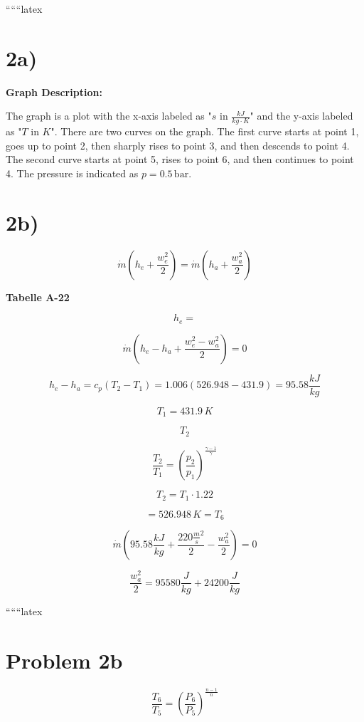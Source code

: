 
``````latex


\section*{2a)}

\begin{center}
\textbf{Graph Description:}
\end{center}

The graph is a plot with the x-axis labeled as "$s$ in \(\frac{kJ}{kg \cdot K}\)" and the y-axis labeled as "$T$ in $K$". There are two curves on the graph. The first curve starts at point 1, goes up to point 2, then sharply rises to point 3, and then descends to point 4. The second curve starts at point 5, rises to point 6, and then continues to point 4. The pressure is indicated as $p = 0.5 \, \text{bar}$.

\section*{2b)}

\[
\dot{m} \left( h_e + \frac{w_e^2}{2} \right) = \dot{m} \left( h_a + \frac{w_a^2}{2} \right)
\]

\textbf{Tabelle A-22}

\[
h_e = 
\]

\[
\dot{m} \left( h_e - h_a + \frac{w_e^2 - w_a^2}{2} \right) = 0
\]

\[
h_e - h_a = c_p (T_2 - T_1) = 1.006 \left( 526.948 - 431.9 \right) = 95.58 \frac{kJ}{kg}
\]

\[
T_1 = 431.9 \, K
\]

\[
T_2
\]

\[
\frac{T_2}{T_1} = \left( \frac{p_2}{p_1} \right)^{\frac{\gamma - 1}{\gamma}}
\]

\[
T_2 = T_1 \cdot 1.22
\]

\[
= 526.948 \, K = T_6
\]

\[
\dot{m} \left( 95.58 \frac{kJ}{kg} + \frac{220 \frac{m}{s}^2}{2} - \frac{w_a^2}{2} \right) = 0
\]

\[
\frac{w_a^2}{2} = 95580 \frac{J}{kg} + 24200 \frac{J}{kg}
\]

``````latex


\section*{Problem 2b}

\[
\frac{T_6}{T_5} = \left( \frac{P_6}{P_5} \right)^{\frac{n-1}{n}}
\]

